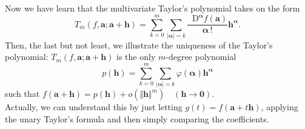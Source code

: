 \documentclass{article}
\newcommand{\Dif}{\mathop{}\!\mathrm{D}}
\begin{document}
\begin{Rmk}{}
    Now we have learn that \textcolor{Df}{the multivariate Taylor's polynomial takes on the form
    $$ T_m(f,\pmb{a};\pmb{a}+\pmb{h}) = \sum_{k=0}^{m} \sum_{|\pmb{\alpha}| = k}\frac{\Dif^{\pmb{\alpha}} f(\pmb{a})}{\pmb{\alpha}\,!} \pmb{h}^{\pmb{\alpha}}. $$}
    Then, the last but not least, we illustrate the uniqueness of the Taylor's polynomial: \textcolor{Th}{$T_m(f,\pmb{a};\pmb{a}+\pmb{h})$ is the only $m$-degree polynomial
    $$ p(\pmb{h}) = \sum_{k=0}^{m} \sum_{|\pmb{\alpha}| = k} \varphi(\pmb{\alpha}) \pmb{h}^{\pmb{\alpha}} $$
    such that $f(\pmb{a}+\pmb{h}) = p(\pmb{h}) + o(\Vert \pmb{h} \Vert^m) \quad (\pmb{h}\rightarrow\pmb{0}).$} \\
    Actually, we can understand this by just letting $g(t) = f(\pmb{a}+t\pmb{h})$, applying the unary Taylor's formula and then simply comparing the coefficients. 
\end{Rmk}
\end{document}
